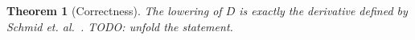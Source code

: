 \documentclass[conference]{IEEEtran}
\newtheorem{theorem}{Theorem}
\begin{document}
\begin{theorem}[Correctness]
    The lowering of \(D̂\) is exactly the derivative defined by Schmid et. al.~\cite{schmid_GuardedKleeneAlgebra_2021}.
    TODO: unfold the statement.
\end{theorem}

\end{document}
